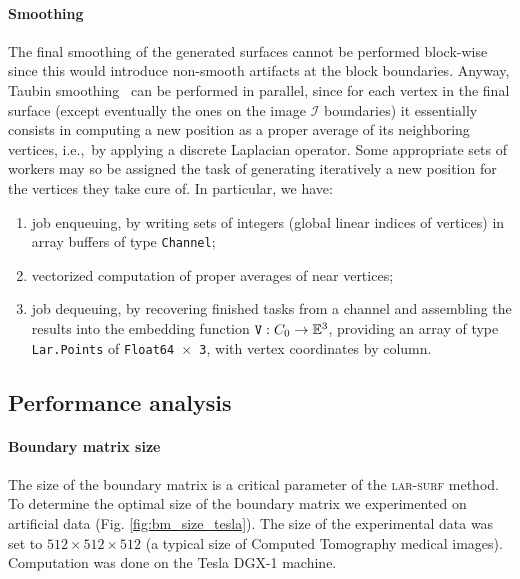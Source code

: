 \paragraph{Smoothing}\label{sec:smoothing}
The final smoothing of the generated surfaces cannot be performed block-wise since this would introduce non-smooth artifacts at the block boundaries. Anyway, Taubin smoothing~\cite{Taubin1995} can be performed in parallel, since for each vertex in the final surface (except eventually the ones on the image $\mathcal{I}$ boundaries) it essentially consists in computing a new position as a proper average of its neighboring vertices, i.e.,~by applying a discrete Laplacian operator.  Some appropriate sets of workers may so be assigned the task of generating iteratively a new position for the vertices they take cure of. In particular, we have:
\begin{enumerate}

\item job enqueuing, by writing sets of integers (global linear indices of vertices) in array buffers of type \texttt{Channel};

\item vectorized computation of proper averages of near vertices;

\item job dequeuing, by recovering finished tasks from a channel and assembling the results into the embedding function $\mathtt{V}: C_0 \to \mathbb{E}^3$, providing an array of type \texttt{Lar.Points} of \texttt{Float64 $\times$ 3}, with vertex coordinates by column.
\end{enumerate}



\subsection{Performance analysis}\label{sec:analysis}

\paragraph{Boundary matrix size}
The size of the boundary matrix is a critical parameter of the \textsc{lar-surf} method. To determine the optimal size of the boundary matrix we experimented on artificial data (Fig.  \ref{fig:bm_size_tesla}). The size of the experimental data was set to $512\times512\times512$ (a typical size of Computed Tomography medical images). Computation was done on the Tesla DGX-1 machine.

